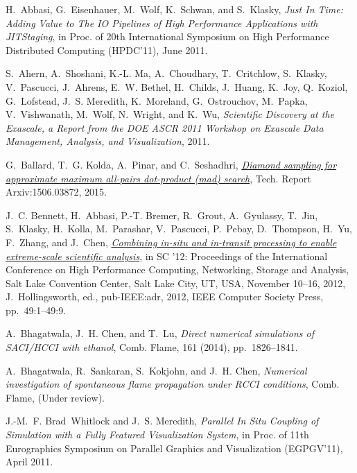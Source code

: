 \documentclass[final]{siamltex}
\begin{document}
\begin{thebibliography}{10}

{\sc H.~Abbasi, G.~Eisenhauer, M.~Wolf, K.~Schwan, and S.~Klasky}, {\em {Just
  In Time: Adding Value to The IO Pipelines of High Performance Applications
  with JITStaging}}, in Proc. of 20th International Symposium on High
  Performance Distributed Computing (HPDC'11), June 2011.

{\sc S.~Ahern, A.~Shoshani, K.-L. Ma, A.~Choudhary, T.~Critchlow, S.~Klasky,
  V.~Pascucci, J.~Ahrens, E.~W. Bethel, H.~Childs, J.~Huang, K.~Joy, Q.~Koziol,
  G.~Lofstead, J.~S. Meredith, K.~Moreland, G.~Ostrouchov, M.~Papka,
  V.~Vishwanath, M.~Wolf, N.~Wright, and K.~Wu}, {\em Scientific Discovery at
  the Exascale, a Report from the DOE ASCR 2011 Workshop on Exascale Data
  Management, Analysis, and Visualization}, 2011.

{\sc G.~Ballard, T.~G. Kolda, A.~Pinar, and C.~Seshadhri},
  \href{http://arxiv.org/abs/1506.03872}{{\em Diamond sampling for approximate
  maximum all-pairs dot-product (mad) search}}, Tech. Report Arxiv:1506.03872,
  2015.

{\sc J.~C. Bennett, H.~Abbasi, P.-T. Bremer, R.~Grout, A.~Gyulassy, T.~Jin,
  S.~Klasky, H.~Kolla, M.~Parashar, V.~Pascucci, P.~Pebay, D.~Thompson, H.~Yu,
  F.~Zhang, and J.~Chen},
  \href{http://conferences.computer.org/sc/2012/papers/1000a089.pdf}{{\em
  Combining in-situ and in-transit processing to enable extreme-scale
  scientific analysis}}, in {SC} '12: Proceedings of the International
  Conference on High Performance Computing, Networking, Storage and Analysis,
  Salt Lake Convention Center, Salt Lake City, {UT}, {USA}, November 10--16,
  2012, J.~Hollingsworth, ed., pub-IEEE:adr, 2012, IEEE Computer Society Press,
  pp.~49:1--49:9.

{\sc A.~Bhagatwala, J.~H. Chen, and T.~Lu}, {\em Direct numerical simulations
  of {SACI}/{HCCI} with ethanol}, Comb. Flame, 161 (2014), pp.~1826--1841.

{\sc A.~Bhagatwala, R.~Sankaran, S.~Kokjohn, and J.~H. Chen}, {\em Numerical
  investigation of spontaneous flame propagation under {RCCI} conditions},
  Comb. Flame,  (Under review).

{\sc J.-M.~F. Brad~Whitlock and J.~S. Meredith}, {\em {Parallel In Situ
  Coupling of Simulation with a Fully Featured Visualization System}}, in Proc.
  of 11th Eurographics Symposium on Parallel Graphics and Visualization
  (EGPGV'11), April 2011.


\end{thebibliography}
\end{document}

